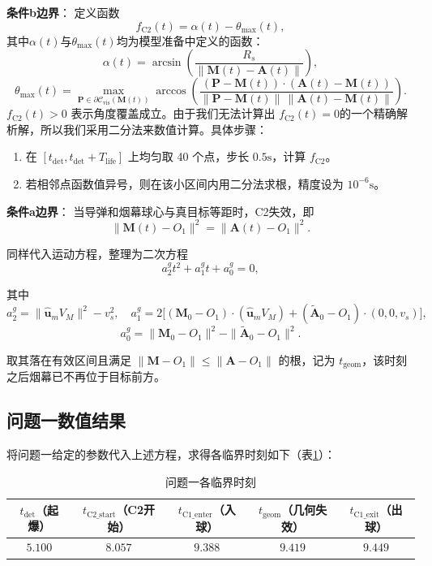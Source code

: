 \documentclass{ctexart}
\begin{document}
\textbf{条件b边界}：
定义函数
\[
f_{\text{C2}}(t) = \alpha(t) - \theta_{\max}(t),
\]
其中$\alpha(t)$与$\theta_{\max}(t)$均为模型准备中定义的函数：
\[
\alpha(t)=\arcsin\!\left(\frac{R_s}{\|\mathbf{M}(t)-\mathbf{A}(t)\|}\right),
\]
\[
\theta_{\max}(t)=\max_{\mathbf{P}\in\partial\mathcal{C}_{\text{vis}}(\mathbf{M}(t))}
\arccos\!\left(
\frac{(\mathbf{P}-\mathbf{M}(t))\cdot(\mathbf{A}(t)-\mathbf{M}(t))}
{\|\mathbf{P}-\mathbf{M}(t)\|\,\|\mathbf{A}(t)-\mathbf{M}(t)\|}
\right).
\]
$f_{\text{C2}}(t)>0$ 表示角度覆盖成立。由于我们无法计算出 $f_{\text{C2}}(t)=0$的一个精确解析解，所以我们采用二分法来数值计算。具体步骤：
\begin{enumerate}
    \item 在 $[t_{\text{det}}, t_{\text{det}}+T_{\text{life}}]$ 上均匀取 40 个点，步长 $0.5\mathrm{s}$，计算 $f_{\text{C2}}$。
    \item 若相邻点函数值异号，则在该小区间内用二分法求根，精度设为 $10^{-6}\mathrm{s}$。
\end{enumerate}

\textbf{条件a边界}：
当导弹和烟幕球心与真目标等距时，C2失效，即
\[
\|\mathbf{M}(t)-O_1\|^2 = \|\mathbf{A}(t)-O_1\|^2.
\]

同样代入运动方程，整理为二次方程
\[
a_2^g t^2 + a_1^g t + a_0^g = 0,
\]

其中
\[
a_2^g = \|\hat{\mathbf{u}}_m V_M\|^2 - v_s^2,\quad
a_1^g = 2\big[(\mathbf{M}_0-O_1)\cdot(\hat{\mathbf{u}}_m V_M) + (\tilde{\mathbf{A}}_0-O_1)\cdot(0,0,v_s)\big],
\]
\[
a_0^g = \|\mathbf{M}_0-O_1\|^2 - \|\tilde{\mathbf{A}}_0-O_1\|^2.
\]

取其落在有效区间且满足 $\|\mathbf{M}-O_1\| \le \|\mathbf{A}-O_1\|$ 的根，记为 $t_{\text{geom}}$，该时刻之后烟幕已不再位于目标前方。

\subsection{问题一数值结果}
将问题一给定的参数代入上述方程，求得各临界时刻如下（表\ref{tab:p1-results}）：
\begin{table}[H]
\centering
\caption{问题一各临界时刻}
\label{tab:p1-results}
\begin{tabular}{c|c|c|c|c}
\toprule
$t_{\text{det}}$（起爆）& $t_{\text{C2\_start}}$（C2开始）& $t_{\text{C1\_enter}}$（入球）& $t_{\text{geom}}$（几何失效）& $t_{\text{C1\_exit}}$（出球）\\
\midrule
$5.100$ & $8.057$ & $9.388$ & $9.419$ & $9.449$ \\
\bottomrule
\end{tabular}
\end{table}
\end{document}
